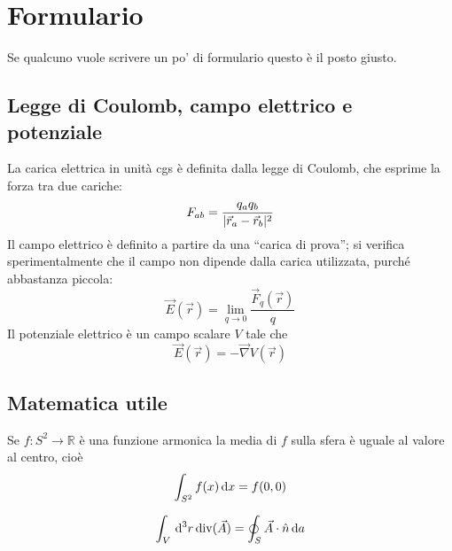 \documentclass[../main.tex]{subfiles}
\begin{document}
\section{Formulario}
\setcounter{equation}{0}
\renewcommand{\theequation}{F.\arabic{equation}}

Se qualcuno vuole scrivere un po' di formulario questo è il posto giusto.

\subsection{Legge di Coulomb, campo elettrico e potenziale}\label{Preliminari}
La carica elettrica in unit\`a cgs \`e definita dalla legge di Coulomb, che esprime la forza tra due cariche:
\begin{equation}
  \label{Coulomb}
  F_{ab}=\frac{q_aq_b}{\lvert\vec r_a -\vec r_b\rvert^2}
\end{equation}
Il campo elettrico \`e definito a partire da una ``carica di prova''; si verifica sperimentalmente che il campo non dipende dalla carica utilizzata, purch\'e abbastanza piccola:
\begin{equation}
  \label{CampoElettrico}
  \vec E(\vec r)=\lim_{q \to 0} \frac{\vec F_q(\vec r)}{q}
\end{equation}
Il potenziale elettrico \`e un campo scalare $V$ tale che
\begin{equation}
  \label{Potenziale}
  \vec E(\vec r) = - \vec \nabla V(\vec r)
\end{equation}

\subsection{Matematica utile}\label{Matematica}
\begin{theorem}
  \label{ThMedia}
  Se $f:S^2 \to \mathbb{R}$ \`e una funzione armonica la media di $f$ sulla sfera \`e uguale al valore al centro, cio\`e
  \begin{equation}
    \int_{S^2} f(x) \,\mathrm d x = f(0,0)
  \end{equation}
\end{theorem}

\begin{theorem}
  \label{ThDivergenza}
  \begin{equation}
    \int_V \,\mathrm d^3 r \operatorname{div}(\vec A) = \oint_S \vec A \cdot \hat n \,\mathrm d a
  \end{equation}
\end{theorem}
\end{document}
